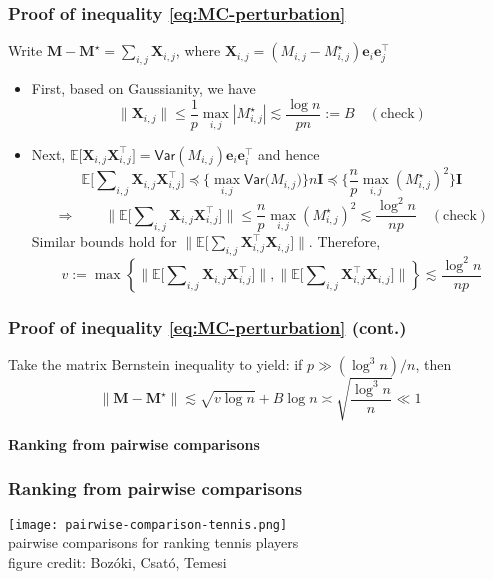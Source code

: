 \documentclass[compress,
mathserif,wide,%
]{beamer}
\begin{document}
\begin{frame}
	\frametitle{Proof of inequality \eqref{eq:MC-perturbation}}

{


Write ${\bm{M}}-\bm{M}^{\star} =\sum_{i,j}\bm{X}_{i,j}$, where $\bm{X}_{i,j}=({M}_{i,j}-M^{\star}_{i,j})\bm{e}_{i}\bm{e}_{j}^{\top}$
\begin{itemize}

\item First, based on Gaussianity, we have
\[
	\|\bm{X}_{i,j}\|\leq\frac{1}{p}\max_{i,j} |M^{\star}_{i,j}| \lesssim\frac{\log n}{pn}:=B \quad (\text{check})
\]


\item Next, $\mathbb{E}\big[\bm{X}_{i,j}\bm{X}_{i,j}^{\top}\big]=\mathsf{Var}({M}_{i,j})\bm{e}_{i}\bm{e}_{i}^{\top}$
and hence
\[
\mathbb{E}\big[\sum\nolimits _{i,j}\bm{X}_{i,j}\bm{X}_{i,j}^{\top}\big]\preceq\Big\{\max_{i,j}\mathsf{Var}\big({M}_{i,j}\big)\Big\} n\bm{I}\preceq\Big\{\frac{n}{p}\max_{i,j}(M^{\star}_{i,j})^{2}\Big\}\bm{I}
\]
\[
\Longrightarrow\qquad\big\|\mathbb{E}\big[\sum\nolimits _{i,j}\bm{X}_{i,j}\bm{X}_{i,j}^{\top}\big]\big\|\leq\frac{n}{p}\max_{i,j}(M^{\star}_{i,j})^{2}\lesssim\frac{\log^{2}n}{np}\quad(\text{check})
\]
Similar bounds hold for $\big\|\mathbb{E}\big[\sum\nolimits _{i,j}\bm{X}_{i,j}^{\top}\bm{X}_{i,j}\big]\big\|$.
Therefore, 
\[
v:=\max\left\{ \big\|\mathbb{E}\big[\sum\nolimits _{i,j}\bm{X}_{i,j}\bm{X}_{i,j}^{\top}\big]\big\|,\big\|\mathbb{E}\big[\sum\nolimits _{i,j}\bm{X}_{i,j}^{\top}\bm{X}_{i,j}\big]\big\|\right\} \lesssim\frac{\log^{2}n}{np}
\]


\end{itemize}



}

\end{frame}

\begin{frame}
	\frametitle{Proof of inequality \eqref{eq:MC-perturbation} (cont.)}
	Take the matrix Bernstein inequality to yield: if $p\gg (\log^{3}n )/n$,
then
\[
 \|\bm{M} - \bm{M}^\star\| \lesssim\sqrt{v\log n}+B\log n \asymp \sqrt{\frac{\log^{3} n }{n}}\ll1
\]
\end{frame}


\begin{frame}[plain]
	\vfill
	\centering
	\large \bf Ranking from pairwise comparisons
	\vfill
\end{frame}



\begin{frame}
	\frametitle{Ranking from pairwise comparisons}


	\begin{center}
		\texttt{[image: pairwise-comparison-tennis.png]} \\
		 pairwise comparisons for ranking tennis players  \\
		\hfill {\footnotesize figure credit: Boz\'{o}ki, Csat\'{o}, Temesi}
	\end{center}

\end{frame}
\end{document}
